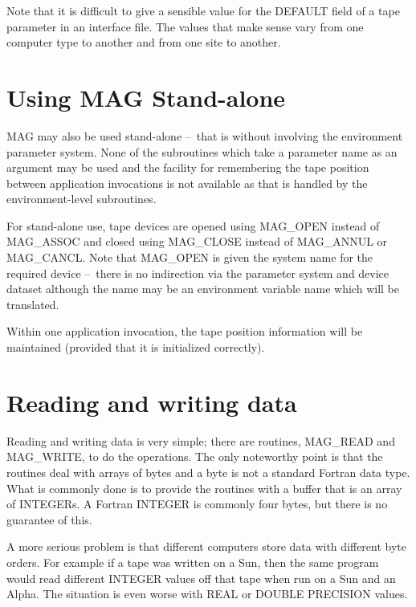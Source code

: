 \documentclass[11pt]{starlink}
\providecommand{\dash}{--}
\begin{document}
Note that it is difficult to give a sensible value for the DEFAULT field of a
tape parameter in an interface file. The values that make sense vary from one
computer type to another and from one site to another.

\section{Using MAG Stand-alone}
MAG may also be used stand-alone \dash\ that is without involving the
environment parameter system.
None of the subroutines which take a parameter name as an
argument may be used and the facility for remembering the tape position between
application invocations is not available as that is handled by the
environment-level subroutines.

For stand-alone use, tape devices are opened using MAG\_OPEN instead
of MAG\_ASSOC and closed using MAG\_CLOSE instead of MAG\_ANNUL or MAG\_CANCL.
Note that MAG\_OPEN is given the system name for the required device
\dash\ there is no indirection via the parameter system and device dataset
although the name may be an environment variable name which will be translated.

Within one application invocation, the tape position information will be
maintained (provided that it is initialized correctly).

\section{Reading and writing data}
Reading and writing data is very simple; there are routines, MAG\_READ
and MAG\_WRITE, to do the operations. The only noteworthy point is that the
routines deal with arrays of bytes and a byte is not a standard Fortran data
type. What is commonly done is to provide the routines with a buffer that is
an array of INTEGERs.
A Fortran INTEGER is commonly four bytes, but there is no guarantee
of this.

A more serious problem is that different computers store data with
different byte orders. For example if a tape was written on a Sun, then the
same program would read different INTEGER values off that tape when run on a
Sun and an Alpha. The situation is even worse with REAL or DOUBLE PRECISION
values.
\end{document}
